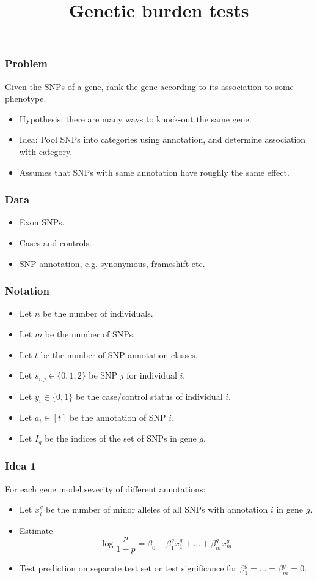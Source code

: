 \documentclass{beamer}
\title{Genetic burden tests}
\begin{document}
\begin{frame}
	\frametitle{Problem}
	Given the SNPs of a gene, rank the gene according to its association to some phenotype.
	\begin{itemize}
		\item Hypothesis: there are many ways to knock-out the same gene.
		\item Idea: Pool SNPs into categories using annotation, and determine association with category.
		\item Assumes that SNPs with same annotation have roughly the same effect.
	\end{itemize}
\end{frame}

\begin{frame}
	\frametitle{Data}
	\begin{itemize}
		\item Exon SNPs.
		\item Cases and controls.
		\item SNP annotation, e.g. synonymous, frameshift etc.
	\end{itemize}
\end{frame}

\begin{frame}
	\frametitle{Notation}
	\begin{itemize}
		\item Let $n$ be the number of individuals.
		\item Let $m$ be the number of SNPs.
		\item Let $t$ be the number of SNP annotation classes.
		\item Let $s_{i,j} \in \{ 0, 1, 2 \}$ be SNP $j$ for individual $i$.
		\item Let $y_i \in \{0,1\}$ be the case/control status of individual $i$.
		\item Let $a_i \in [t]$ be the annotation of SNP $i$.
		\item Let $I_g$ be the indices of the set of SNPs in gene $g$.
	\end{itemize}
\end{frame}

\begin{frame}
	\frametitle{Idea 1}
	For each gene model severity of different annotations:
	\begin{itemize}
		\item Let $x_i^g$ be the number of minor alleles of all SNPs with annotation $i$ in gene $g$.
		\item Estimate
		$$ \log \frac{p}{1-p} = \beta_0 + \beta_1^g x_1^g + ... + \beta_m^g x_m^g$$
		\item Test prediction on separate test set or test significance for $\beta_1^g = ... = \beta_m^g = 0$.
	\end{itemize}
\end{frame}
\end{document}
